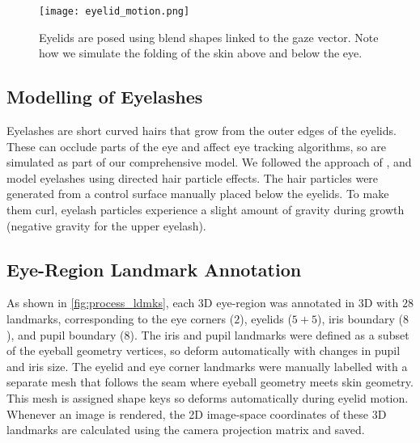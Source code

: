 \begin{figure}
    \texttt{[image: eyelid\_motion.png]}
    \caption{Eyelids are posed using blend shapes linked to the gaze vector. Note how we simulate the folding of the skin above and below the eye.}
    \label{fig:eyelids}
\end{figure}

\subsection{Modelling of Eyelashes}

Eyelashes are short curved hairs that grow from the outer edges of the eyelids.
These can occlude parts of the eye and affect eye tracking algorithms, so are simulated as part of our comprehensive model.
We followed the approach of \citet{swirski2014rendering}, and model eyelashes using directed hair particle effects.
The hair particles were generated from a control surface manually placed below the eyelids.
To make them curl, eyelash particles experience a slight amount of gravity during growth (negative gravity for the upper eyelash).

\subsection{Eye-Region Landmark Annotation}

As shown in \autoref{fig:process_ldmks}, each 3D eye-region was annotated in 3D with $28$ landmarks, corresponding to the eye corners ($2$), eyelids ($5\!+\!5$), iris boundary ($8$), and pupil boundary ($8$).
The iris and pupil landmarks were defined as a subset of the eyeball geometry vertices, so deform automatically with changes in pupil and iris size.
The eyelid and eye corner landmarks were manually labelled with a separate mesh that follows the seam where eyeball geometry meets skin geometry.
This mesh is assigned shape keys so deforms automatically during eyelid motion.
%
Whenever an image is rendered, the 2D image-space coordinates of these 3D landmarks are calculated using the camera projection matrix and saved.